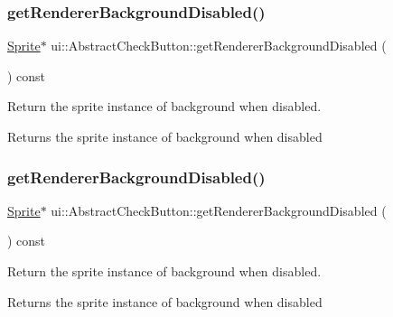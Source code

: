 \subsubsection{\texorpdfstring{get\+Renderer\+Background\+Disabled()}{getRendererBackgroundDisabled()}\hspace{0.1cm}{\footnotesize\ttfamily [1/2]}}
{\footnotesize\ttfamily \hyperlink{classSprite}{Sprite}$\ast$ ui\+::\+Abstract\+Check\+Button\+::get\+Renderer\+Background\+Disabled (\begin{DoxyParamCaption}{ }\end{DoxyParamCaption}) const\hspace{0.3cm}{\ttfamily [inline]}}



Return the sprite instance of background when disabled. 

\begin{DoxyReturn}{Returns}
the sprite instance of background when disabled 
\end{DoxyReturn}
\mbox{\label{classui_1_1AbstractCheckButton_a0dedc2cffba903975cfff7a6c21d90e8}} 
\subsubsection{\texorpdfstring{get\+Renderer\+Background\+Disabled()}{getRendererBackgroundDisabled()}\hspace{0.1cm}{\footnotesize\ttfamily [2/2]}}
{\footnotesize\ttfamily \hyperlink{classSprite}{Sprite}$\ast$ ui\+::\+Abstract\+Check\+Button\+::get\+Renderer\+Background\+Disabled (\begin{DoxyParamCaption}{ }\end{DoxyParamCaption}) const\hspace{0.3cm}{\ttfamily [inline]}}



Return the sprite instance of background when disabled. 

\begin{DoxyReturn}{Returns}
the sprite instance of background when disabled 
\end{DoxyReturn}
\mbox{\label{classui_1_1AbstractCheckButton_a1ba602c981e86948cc82b020f8e94958}} 
